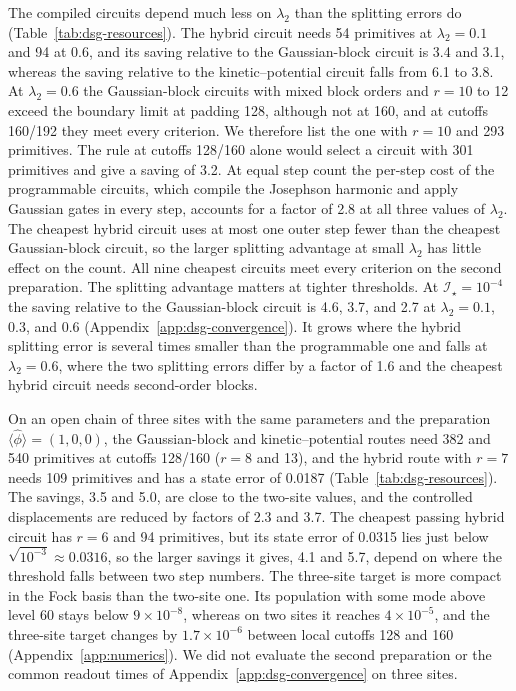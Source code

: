\documentclass[pra,twocolumn,superscriptaddress,nofootinbib,floatfix]{revtex4-2}
\theoremstyle{remark}
\newcommand{\revcolor}{\color{blue}}
\DeclareRobustCommand{\rev}[1]{{\revcolor #1}}
\begin{document}
\rev{The compiled circuits depend much less on \(\lambda_2\) than the splitting errors do (Table~\ref{tab:dsg-resources}).} \rev{The hybrid circuit needs 54 primitives at \(\lambda_2=0.1\) and 94 at 0.6, and its saving relative to the Gaussian-block circuit is 3.4 and 3.1, whereas the saving relative to the kinetic--potential circuit falls from 6.1 to 3.8.} \rev{At \(\lambda_2=0.6\) the Gaussian-block circuits with mixed block orders and \(r=10\) to 12 exceed the boundary limit at padding 128, although not at 160, and at cutoffs 160/192 they meet every criterion.} \rev{We therefore list the one with \(r=10\) and 293 primitives.} \rev{The rule at cutoffs 128/160 alone would select a circuit with 301 primitives and give a saving of 3.2.} \rev{At equal step count the per-step cost of the programmable circuits, which compile the Josephson harmonic and apply Gaussian gates in every step, accounts for a factor of 2.8 at all three values of \(\lambda_2\).} \rev{The cheapest hybrid circuit uses at most one outer step fewer than the cheapest Gaussian-block circuit, so the larger splitting advantage at small \(\lambda_2\) has little effect on the count.} \rev{All nine cheapest circuits meet every criterion on the second preparation.} \rev{The splitting advantage matters at tighter thresholds.} \rev{At \(\mathcal I_\star=10^{-4}\) the saving relative to the Gaussian-block circuit is 4.6, 3.7, and 2.7 at \(\lambda_2=0.1\), 0.3, and 0.6 (Appendix~\ref{app:dsg-convergence}).} \rev{It grows where the hybrid splitting error is several times smaller than the programmable one and falls at \(\lambda_2=0.6\), where the two splitting errors differ by a factor of 1.6 and the cheapest hybrid circuit needs second-order blocks.}

\rev{On an open chain of three sites with the same parameters and the preparation \(\langle\hat\phi\rangle=(1,0,0)\), the Gaussian-block and kinetic--potential routes need 382 and 540 primitives at cutoffs 128/160 (\(r=8\) and 13), and the hybrid route with \(r=7\) needs 109 primitives and has a state error of 0.0187 (Table~\ref{tab:dsg-resources}).} \rev{The savings, 3.5 and 5.0, are close to the two-site values, and the controlled displacements are reduced by factors of 2.3 and 3.7.} \rev{The cheapest passing hybrid circuit has \(r=6\) and 94 primitives, but its state error of 0.0315 lies just below \(\sqrt{10^{-3}}\approx0.0316\), so the larger savings it gives, 4.1 and 5.7, depend on where the threshold falls between two step numbers.} \rev{The three-site target is more compact in the Fock basis than the two-site one.} \rev{Its population with some mode above level 60 stays below \(9\times10^{-8}\), whereas on two sites it reaches \(4\times10^{-5}\), and the three-site target changes by \(1.7\times10^{-6}\) between local cutoffs 128 and 160 (Appendix~\ref{app:numerics}).} \rev{We did not evaluate the second preparation or the common readout times of Appendix~\ref{app:dsg-convergence} on three sites.}
\end{document}
